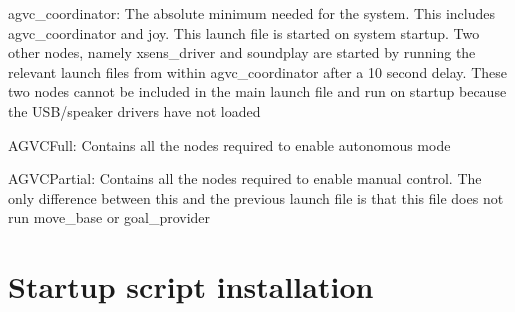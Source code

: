 \begin{DoxyItemize}
\item {\ttfamily agvc\-\_\-coordinator\-:} \-The absolute minimum needed for the system. \-This includes agvc\-\_\-coordinator and joy. \-This launch file is started on system startup. \-Two other nodes, namely xsens\-\_\-driver and soundplay are started by running the relevant launch files from within agvc\-\_\-coordinator after a 10 second delay. \-These two nodes cannot be included in the main launch file and run on startup because the \-U\-S\-B/speaker drivers have not loaded
\item {\ttfamily \-A\-G\-V\-C\-Full\-:} \-Contains all the nodes required to enable autonomous mode
\item {\ttfamily \-A\-G\-V\-C\-Partial\-:} \-Contains all the nodes required to enable manual control. \-The only difference between this and the previous launch file is that this file does not run move\-\_\-base or goal\-\_\-provider
\end{DoxyItemize}\hypertarget{index_script}{}\section{\-Startup script installation}\label{index_script}


